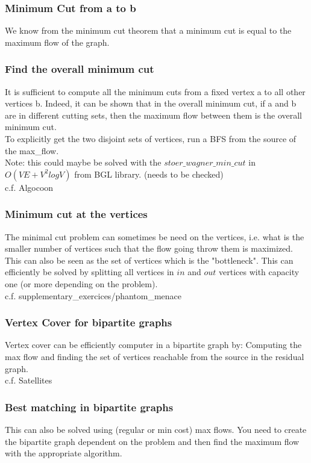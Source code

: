 \documentclass{article}
\begin{document}
\subsubsection{Minimum Cut from a to b}
We know from the minimum cut theorem that a minimum cut is equal to the maximum flow of the graph.
\subsubsection{Find the overall minimum cut}
It is sufficient to compute all the minimum cuts from a fixed vertex a to all other vertices b. Indeed, it can be shown that in the overall minimum cut, if a and b are in different cutting sets, then the maximum flow between them is the overall minimum cut. \\
To explicitly get the two disjoint sets of vertices, run a BFS from the source of the max\_flow. \\
Note: this could maybe be solved with the $stoer\_wagner\_min\_cut$ in $O(VE + V^2log V)$ from BGL library. (needs to be checked) \\
c.f. Algocoon

\subsubsection{Minimum cut at the vertices}
The minimal cut problem can sometimes be need on the vertices, i.e. what is the smaller number of vertices such that the flow going throw them is maximized. This can also be seen as the set of vertices which is the "bottleneck". This can efficiently be solved by splitting all vertices in $in$ and $out$ vertices with capacity one (or more depending on the problem). \\
c.f. supplementary\_exercices/phantom\_menace

\subsubsection{Vertex Cover for bipartite graphs}
Vertex cover can be efficiently computer in a bipartite graph by:
Computing the max flow and finding the set of vertices reachable from the source in the residual graph. \\
c.f. Satellites

\subsubsection{Best matching in bipartite graphs}
This can also be solved using (regular or min cost) max flows. You need to create the bipartite graph dependent on the problem and then find the maximum flow with the appropriate algorithm.
\end{document}
